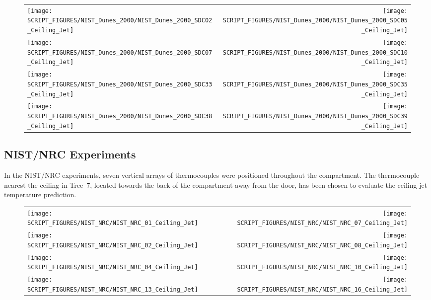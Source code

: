 \begin{figure}[h!]
\begin{tabular*}{\textwidth}{l@{\extracolsep{\fill}}r}
\texttt{[image: SCRIPT\_FIGURES/NIST\_Dunes\_2000/NIST\_Dunes\_2000\_SDC02\_Ceiling\_Jet]} &
\texttt{[image: SCRIPT\_FIGURES/NIST\_Dunes\_2000/NIST\_Dunes\_2000\_SDC05\_Ceiling\_Jet]} \\
\texttt{[image: SCRIPT\_FIGURES/NIST\_Dunes\_2000/NIST\_Dunes\_2000\_SDC07\_Ceiling\_Jet]} &
\texttt{[image: SCRIPT\_FIGURES/NIST\_Dunes\_2000/NIST\_Dunes\_2000\_SDC10\_Ceiling\_Jet]} \\
\texttt{[image: SCRIPT\_FIGURES/NIST\_Dunes\_2000/NIST\_Dunes\_2000\_SDC33\_Ceiling\_Jet]} &
\texttt{[image: SCRIPT\_FIGURES/NIST\_Dunes\_2000/NIST\_Dunes\_2000\_SDC35\_Ceiling\_Jet]} \\
\texttt{[image: SCRIPT\_FIGURES/NIST\_Dunes\_2000/NIST\_Dunes\_2000\_SDC38\_Ceiling\_Jet]} &
\texttt{[image: SCRIPT\_FIGURES/NIST\_Dunes\_2000/NIST\_Dunes\_2000\_SDC39\_Ceiling\_Jet]}
\end{tabular*}
\label{NIST_Dunes_2000_Ceiling_Jet}
\end{figure}


\clearpage

\subsection{NIST/NRC Experiments}

In the NIST/NRC experiments, seven vertical arrays of thermocouples were positioned throughout the compartment.
The thermocouple nearest the ceiling in Tree~7, located towards the back of the compartment away from the door,
has been chosen to evaluate the ceiling jet temperature prediction.

\newpage

\begin{figure}[p]
\begin{tabular*}{\textwidth}{l@{\extracolsep{\fill}}r}
\texttt{[image: SCRIPT\_FIGURES/NIST\_NRC/NIST\_NRC\_01\_Ceiling\_Jet]} &
\texttt{[image: SCRIPT\_FIGURES/NIST\_NRC/NIST\_NRC\_07\_Ceiling\_Jet]} \\
\texttt{[image: SCRIPT\_FIGURES/NIST\_NRC/NIST\_NRC\_02\_Ceiling\_Jet]} &
\texttt{[image: SCRIPT\_FIGURES/NIST\_NRC/NIST\_NRC\_08\_Ceiling\_Jet]} \\
\texttt{[image: SCRIPT\_FIGURES/NIST\_NRC/NIST\_NRC\_04\_Ceiling\_Jet]} &
\texttt{[image: SCRIPT\_FIGURES/NIST\_NRC/NIST\_NRC\_10\_Ceiling\_Jet]} \\
\texttt{[image: SCRIPT\_FIGURES/NIST\_NRC/NIST\_NRC\_13\_Ceiling\_Jet]} &
\texttt{[image: SCRIPT\_FIGURES/NIST\_NRC/NIST\_NRC\_16\_Ceiling\_Jet]}
\end{tabular*}
\label{NIST_NRC_Jet_Closed}
\end{figure}

